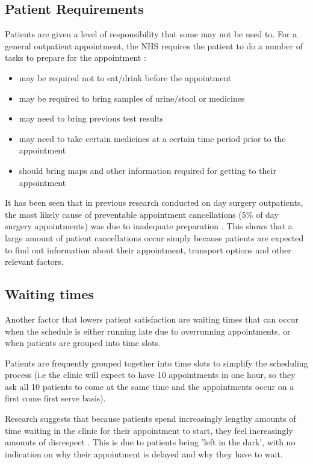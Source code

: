 \subsection{Patient Requirements}

Patients are given a level of responsibility that some may not be used to. For a general outpatient appointment, the NHS requires the patient to do a number of tasks to prepare for the appointment \cite{OutpatientApointWebsite}:

\begin{itemize}
  \item may be required not to eat/drink before the appointment
  \item may be required to bring samples of urine/stool or medicines
  \item may need to bring previous test results
  \item may need to take certain medicines at a certain time period prior to the appointment
  \item should bring maps and other information required for getting to their appointment
\end{itemize}

It has been seen that in previous research conducted on day surgery outpatients, the most likely cause of preventable appointment cancellations (5\% of day surgery appointments) was due to inadequate preparation \cite{Macarthur}. This shows that a large amount of patient cancellations occur simply because patients are expected to find out information about their appointment, transport options and other relevant factors.

\subsection{Waiting times}

Another factor that lowers patient satisfaction are waiting times that can occur when the schedule is either running late due to overrunning appointments, or when patients are grouped into time slots.

Patients are frequently grouped together into time slots to simplify the scheduling process (i.e the clinic will expect to have 10 appointments in one hour, so they ask all 10 patients to come at the same time and the appointments occur on a first come first serve basis).

Research suggests that because patients spend increasingly lengthy amounts of time waiting in the clinic for their appointment to start, they feel increasingly amounts of disrespect \cite{Lacy}. This is due to patients being 'left in the dark', with no indication on why their appointment is delayed and why they have to wait.

